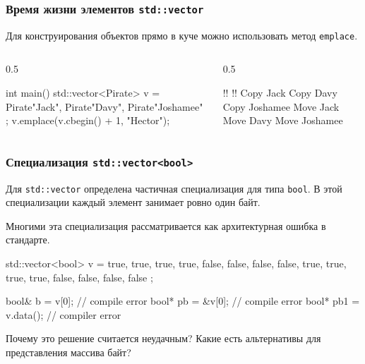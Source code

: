 \documentclass[compress, 8pt]{beamer}
\begin{document}
  \begin{frame}[fragile]

    \frametitle{Время жизни элементов \texttt{std::vector}}

    Для конструирования объектов прямо в куче можно использовать
    метод \texttt{emplace}.

    \begin{columns}[T]

      \begin{column}{0.5\textwidth}

        \begin{mycppinplacelisting}
int main() {
    std::vector<Pirate> v = {
        Pirate{"Jack"},
        Pirate{"Davy"},
        Pirate{"Joshamee"}
    };
    v.emplace(v.cbegin() + 1,
         "Hector");
}
        \end{mycppinplacelisting}

      \end{column}

      \begin{column}{0.5\textwidth}

        \begin{terminalwindow}
!!
!!
Copy Jack
Copy Davy
Copy Joshamee
Move Jack
Move Davy
Move Joshamee
        \end{terminalwindow}

      \end{column}

    \end{columns}

  \end{frame}

  \begin{frame}[fragile]

    \frametitle{Специализация \texttt{std::vector<bool>}}

    Для \texttt{std::vector} определена частичная специализация
    для типа \texttt{bool}.
    В этой специализации каждый элемент занимает ровно один байт.

    \hfill \break
    Многими эта специализация рассматривается как архитектурная ошибка
    в стандарте.

    \begin{mycppinplacelisting}
std::vector<bool> v = {
    true, true, true, true,
    false, false, false, false,
    true, true, true, true,
    false, false, false, false
};

bool& b = v[0]; // compile error
bool* pb = &v[0]; // compile error
bool* pb1 = v.data(); // compiler error
    \end{mycppinplacelisting}

    \begin{task}
      Почему это решение считается неудачным?
      Какие есть альтернативы для представления массива
      байт?
    \end{task}

  \end{frame}
\end{document}
